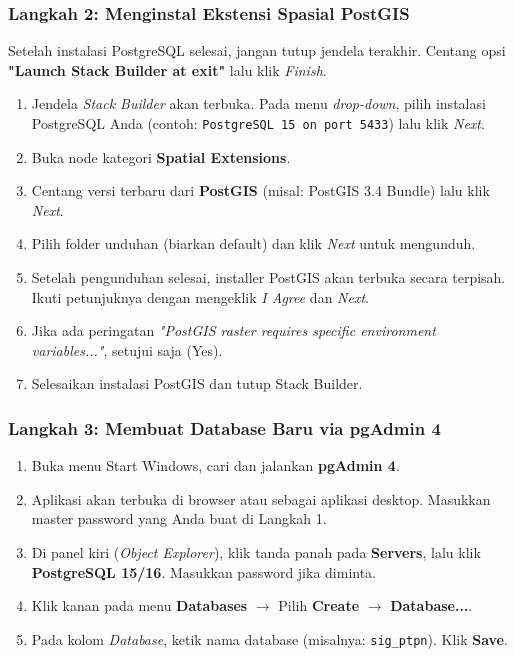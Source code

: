 \documentclass[12pt, a4paper]{article}
\begin{document}
\subsubsection*{Langkah 2: Menginstal Ekstensi Spasial PostGIS}
Setelah instalasi PostgreSQL selesai, jangan tutup jendela terakhir. Centang opsi \textbf{"Launch Stack Builder at exit"} lalu klik \textit{Finish}.
\begin{enumerate}
    \item Jendela \textit{Stack Builder} akan terbuka. Pada menu \textit{drop-down}, pilih instalasi PostgreSQL Anda (contoh: \texttt{PostgreSQL 15 on port 5433}) lalu klik \textit{Next}.
    \item Buka node kategori \textbf{Spatial Extensions}.
    \item Centang versi terbaru dari \textbf{PostGIS} (misal: PostGIS 3.4 Bundle) lalu klik \textit{Next}.
    \item Pilih folder unduhan (biarkan default) dan klik \textit{Next} untuk mengunduh.
    \item Setelah pengunduhan selesai, installer PostGIS akan terbuka secara terpisah. Ikuti petunjuknya dengan mengeklik \textit{I Agree} dan \textit{Next}.
    \item Jika ada peringatan \textit{"PostGIS raster requires specific environment variables..."}, setujui saja (Yes).
    \item Selesaikan instalasi PostGIS dan tutup Stack Builder.
\end{enumerate}

\subsubsection*{Langkah 3: Membuat Database Baru via pgAdmin 4}
\begin{enumerate}
    \item Buka menu Start Windows, cari dan jalankan \textbf{pgAdmin 4}.
    \item Aplikasi akan terbuka di browser atau sebagai aplikasi desktop. Masukkan master password yang Anda buat di Langkah 1.
    \item Di panel kiri (\textit{Object Explorer}), klik tanda panah pada \textbf{Servers}, lalu klik \textbf{PostgreSQL 15/16}. Masukkan password jika diminta.
    \item Klik kanan pada menu \textbf{Databases} $\rightarrow$ Pilih \textbf{Create} $\rightarrow$ \textbf{Database...}.
    \item Pada kolom \textit{Database}, ketik nama database (misalnya: \texttt{sig\_ptpn}). Klik \textbf{Save}.
\end{enumerate}
\end{document}
